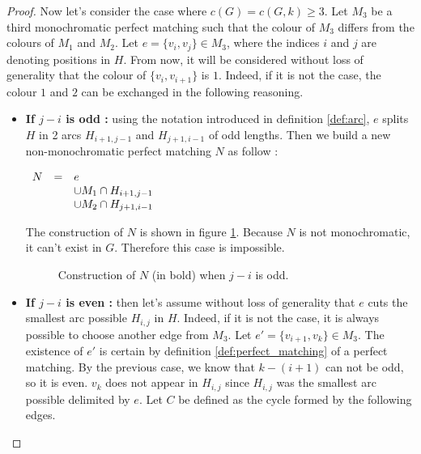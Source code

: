\begin{proof}
    Now let's consider the case where $c(G) = c(G, k) \geq 3$. Let $M_3$ be a third monochromatic perfect matching such that the colour of $M_3$ differs from the colours of $M_1$ and $M_2$. Let $e = \{v_i, v_j\} \in M_3$, where the indices $i$ and $j$ are denoting positions in $H$. From now, it will be considered without loss of generality that the colour of $\{v_i, v_{i+1}\}$ is $1$. Indeed, if it is not the case, the colour $1$ and $2$ can be exchanged in the following reasoning.

    \begin{itemize}
        \item
            \textbf{If $j - i$ is odd :} using the notation introduced in definition \ref{def:arc}, $e$ splits $H$ in 2 arcs $H_{i+1, j-1}$ and $H_{j+1, i-1}$ of odd lengths. Then we build a new non-monochromatic perfect matching $N$ as follow :
            
            \begin{center}
                $\begin{array}{r c l}
                    N & = & e \\
                      &   & \cup M_1 \cap H_{i+1, j-1} \\
                      &   & \cup M_2 \cap H_{j+1, i-1}
                \end{array}$
            \end{center}
            
            The construction of $N$ is shown in figure \ref{fig:proof_simplified_odd}. Because $N$ is not monochromatic, it can't exist in $G$. Therefore this case is impossible.
            
            \begin{figure}[H]
                \caption{Construction of $N$ (in bold) when $j - i$ is odd.}
                \label{fig:proof_simplified_odd}
            \end{figure}
            
        \item 
            \textbf{If $j - i$ is even :} then let's assume without loss of generality that $e$ cuts the smallest arc possible $H_{i, j}$ in $H$. Indeed, if it is not the case, it is always possible to choose another edge from $M_3$. Let $e' = \{v_{i + 1}, v_k\} \in M_3$. The existence of $e'$ is certain by definition \ref{def:perfect_matching} of a perfect matching. By the previous case, we know that $k - (i + 1)$ can not be odd, so it is even. $v_k$ does not appear in $H_{i, j}$ since $H_{i, j}$ was the smallest arc possible delimited by $e$. Let $C$ be defined as the cycle formed by the following edges.
            

\end{itemize}
\end{proof}
